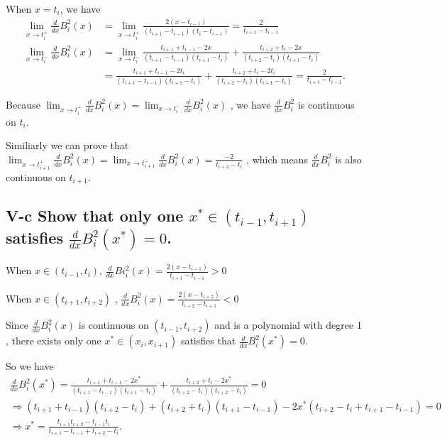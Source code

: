 \documentclass[twoside,a4paper]{article}
\begin{document}
When $x=t_{i}$, we have
\begin{equation*}
	\begin{split}
	\lim_{x\to t_i^{+}}\frac{d}{dx}B^{2}_{i}\left( x \right) 
	&=\lim_{x\to t_i^{+}}\frac{2\left( x-t_{i-1} \right) }{\left( t_{i+1}-t_{i-1} \right)\left( t_{i}-t_{i-1} \right)  }
	=\frac{2}{t_{i+1}-t_{i-1}}\\
	\lim_{x\to t_i^{-}}\frac{d}{dx}B^{2}_{i}\left( x \right) 
	&=\lim_{x\to t_i^{-}}\frac{t_{i+1}+t_{i-1}-2x}{\left( t_{i+1}-t_{i-1} \right)\left( t_{i+1}-t_{i} \right)  }
	+\frac{t_{i+2}+t_{i}-2x}{\left( t_{i+2}-t_{i} \right)\left( t_{i+1}-t_{i} \right)  }\\
	&=\frac{t_{i+1}+t_{i-1}-2t_i}{\left( t_{i+1}-t_{i-1} \right)\left( t_{i+1}-t_{i} \right) }
	+\frac{t_{i+2}+t_{i}-2t_i}{\left( t_{i+2}-t_{i} \right)\left( t_{i+1}-t_{i} \right)  }
	=\frac{2}{t_{i+1}-t_{i-1}}
.
\end{split}
\end{equation*}

Because $\lim_{x\to t_i^{+}}\frac{d}{dx}B^{2}_{i}\left( x \right)=\lim_{x\to t_i^{-}}\frac{d}{dx}B^{2}_{i}\left( x \right) $
, we have $\frac{d}{dx}B^{2}_{i}$ is continuous on $t_{i}$.

Similiarly we can prove that
$\lim_{x\to t_{i+1}^{+}}\frac{d}{dx}B^{2}_{i}\left( x \right)=\lim_{x\to t_{i+1}^{-}}\frac{d}{dx}B^{2}_{i}\left( x \right) 
=\frac{-2}{t_{i+2}-t_{i}}$
, which means $\frac{d}{dx}B^{2}_{i}$ is also continuous on $t_{i+1}$.

\subsection*{V-c \small{Show that only one $x^{*}\in\left( t_{i-1},t_{i+1} \right) $ satisfies 
$\frac{d}{dx}B^{2}_{i}\left(  x^{*}\right)=0 $.}}
When $x\in(t_{i-1},t_{i})$, $\frac{d}{dx}Bi^{2}_{i}\left( x \right)=\frac{2\left( x-t_{i-1} \right) }{t_{i+1}-t_{i-1}}>0 $ 

When $x\in\left( t_{i+1},t_{i+2} \right) $ 
, $\frac{d}{dx}B^{2}_{i}\left( x \right)=\frac{2\left( x-t_{i+2} \right) }{t_{i+2}-t_{i+1}}<0 $ 

Since $\frac{d}{dx}B^{2}_{i}\left( x \right) $ is continuous on $\left( t_{i-1}, t_{i+2} \right) $ 
and is a polynomial with degree 1
, there exists only one $x^{*}\in\left( x_{i},x_{i+1} \right) $ satisfies that $\frac{d}{dx}B^{2}_{i}\left( x^{*} \right)=0 $.

So we have
\begin{equation*}
	\begin{split}
		\frac{d}{dx}B^{2}_{i}\left( x^{*} \right)
		=\frac{t_{i+1}+t_{i-1}-2x^{*}}{\left( t_{i+1}-t_{i-1}\right)\left( t_{i+1}-t_{i} \right)  }
		+\frac{t_{i+2}+t_{i}-2x^{*}}{\left( t_{i+2}-t_{i} \right)\left( t_{i+2}-t_{i} \right)  }=0&\\
		\Longrightarrow\left( t_{i+1}+t_{i-1}\right)\left( t_{i+2}-t_{i} \right)+\left( t_{i+2}+t_{i} \right)\left( t_{i+1}-t_{i-1} \right)
		-2x^{*}\left( t_{i+2}-t_{i}+t_{i+1}-t_{i-1} \right)=0&\\
		\Longrightarrow x^{*}=\frac{t_{i+1}t_{i+2}-t_{i-1}t_{i}}{t_{i+1}-t_{i-1}+t_{i+2}-t_{i}}.&
	\end{split}
\end{equation*}
\end{document}
